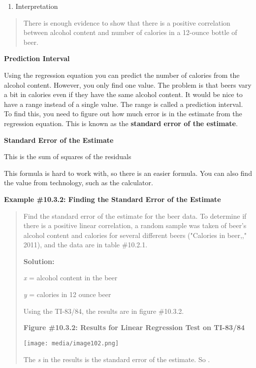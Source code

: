 \documentclass[]{book}
\providecommand{\tightlist}{%
  \setlength{\itemsep}{0pt}\setlength{\parskip}{0pt}}
\begin{document}
\begin{enumerate}
\def\labelenumi{\arabic{enumi}.}
\setcounter{enumi}{5}
\tightlist
\item
  Interpretation
\end{enumerate}

\begin{quote}
There is enough evidence to show that there is a positive correlation between alcohol content and number of calories in a 12-ounce bottle of beer.
\end{quote}

\textbf{Prediction Interval}

Using the regression equation you can predict the number of calories from the alcohol content. However, you only find one value. The problem is that beers vary a bit in calories even if they have the same alcohol content. It would be nice to have a range instead of a single value. The range is called a prediction interval. To find this, you need to figure out how much error is in the estimate from the regression equation. This is known as the \textbf{standard error of the estimate}.

\textbf{Standard Error of the Estimate}

This is the sum of squares of the residuals

This formula is hard to work with, so there is an easier formula. You can also find the value from technology, such as the calculator.

\textbf{Example \#10.3.2: Finding the Standard Error of the Estimate}

\begin{quote}
Find the standard error of the estimate for the beer data. To determine if there is a positive linear correlation, a random sample was taken of beer's alcohol content and calories for several different beers ("Calories in beer,," 2011), and the data are in table \#10.2.1.

\textbf{Solution:}

\emph{x} = alcohol content in the beer

\emph{y} = calories in 12 ounce beer

Using the TI-83/84, the results are in figure \#10.3.2.

\textbf{Figure \#10.3.2: Results for Linear Regression Test on TI-83/84}

\texttt{[image: media/image102.png]}

The \emph{s} in the results is the standard error of the estimate. So .
\end{quote}
\end{document}
